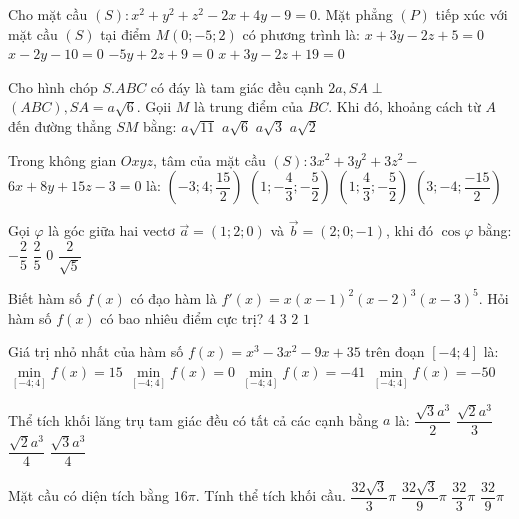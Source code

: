 \begin{ex}%
Cho mặt cầu $(S)\colon x^2+y^2+z^2-2 x+4 y-9=0$. Mặt phẳng $(P)$ tiếp xúc với mặt cầu $(S)$ tại điểm $M(0;-5; 2)$ có phương trình là:
\choice
{$x+3 y-2 z+5=0$}
{\True $x-2 y-10=0$}
{$-5 y+2 z+9=0$}
{$x+3 y-2 z+19=0$}

\end{ex}
\begin{ex}%
Cho hình chóp $S.ABC$ có đáy là tam giác đều cạnh $2 a, SA \perp$ $(ABC), SA=a \sqrt{6}$. Gọii $M$ là trung điểm của $BC$. Khi đó, khoảng cách từ $A$ đến đường thẳng $SM$ bằng:
\choice
{$a \sqrt{11}$}
{$a \sqrt{6}$}
{$a \sqrt{3}$}
{\True $a \sqrt{2}$}

\end{ex}
\begin{ex}%
Trong không gian $O x y z$, tâm của mặt cầu $(S)\colon 3 x^2+3 y^2+3 z^2-$ $6 x+8 y+15 z-3=0$ là:
\choice
{$\left(-3; 4; \dfrac{15}{2}\right)$}
{\True $\left(1;-\dfrac{4}{3};-\dfrac{5}{2}\right)$}
{$\left(1; \dfrac{4}{3};-\dfrac{5}{2}\right)$}
{$\left(3;-4; \dfrac{-15}{2}\right)$}

\end{ex}
\begin{ex}%
Gọi $\varphi$ là góc giữa hai vectơ $\vec{a}=(1; 2; 0)$ và $\vec{b}=(2; 0;-1)$, khi đó $\cos \varphi$ bằng:
\choice
{$-\dfrac{2}{5}$}
{\True $\dfrac{2}{5}$}
{$0$}
{$\dfrac{2}{\sqrt{5}}$}

\end{ex}
\begin{ex}%
Biết hàm số $f(x)$ có đạo hàm là $f'(x)=x(x-1)^2(x-2)^3(x-3)^5$. Hỏi hàm số $f(x)$ có bao nhiêu điểm cực trị?
\choice
{$4$}
{\True $3$}
{$2$}
{$1$}

\end{ex}
\begin{ex}%
Giá trị nhỏ nhất của hàm số $f(x)=x^3-3 x^2-9 x+35$ trên đoạn $[-4; 4]$ là:
\choice
{$\min\limits_{[-4; 4]} f(x)=15$}
{$\min\limits_{[-4; 4]} f(x)=0$}
{\True $\min\limits_{[-4; 4]} f(x)=-41$}
{$\min\limits_{[-4; 4]} f(x)=-50$}

\end{ex}
\begin{ex}%
Thể tích khối lăng trụ tam giác đều có tất cả các cạnh bằng $a$ là:
\choice
{$\dfrac{\sqrt{3} a^3}{2}$}
{$\dfrac{\sqrt{2} a^3}{3}$}
{$\dfrac{\sqrt{2} a^3}{4}$}
{\True $\dfrac{\sqrt{3} a^3}{4}$}

\end{ex}
\begin{ex}%
Mặt cầu có diện tích bằng $16\pi$. Tính thể tích khối cầu.
\choice
{$\dfrac{32\sqrt{3}}{3} \pi$}
{$\dfrac{32\sqrt{3}}{9} \pi$}
{\True $\dfrac{32}{3} \pi$}
{$\dfrac{32}{9} \pi$}

\end{ex}
